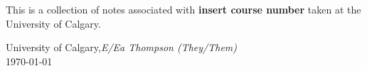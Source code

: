 %
%

\preface

This is a collection of notes associated with \textbf{insert course number} taken at the University of Calgary.
 

\vspace{\baselineskip}
\begin{flushright}\noindent
University of Calgary,\hfill {\it E/Ea Thompson (They/Them)}\\
\today \hfill \\
\end{flushright}


